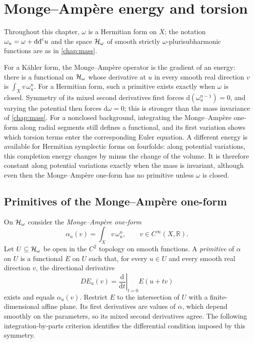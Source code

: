 \chapter{Monge--Amp\`ere energy and torsion}
\label{chap:energy}

Throughout this chapter, $\omega$ is a Hermitian form on $X$; the notation $\omega_u=\omega+\mathrm{dd}^{\mathrm{c}} u$ and the space $\mathcal H_\omega$ of smooth strictly $\omega$-plurisubharmonic functions are as in \cref{chap:mass}.

For a K\"ahler form, the Monge--Amp\`ere operator is the gradient of an energy: there is a functional on $\mathcal H_\omega$ whose derivative at $u$ in every smooth real direction $v$ is $\int_Xv\,\omega_u^n$. For a Hermitian form, such a primitive exists exactly when $\omega$ is closed. Symmetry of its mixed second derivatives first forces $\mathrm d(\omega_u^{n-1})=0$, and varying the potential then forces $\mathrm d\omega=0$; this is stronger than the mass invariance of \cref{chap:mass}. For a nonclosed background, integrating the Monge--Amp\`ere one-form along radial segments still defines a functional, and its first variation shows which torsion terms enter the corresponding Euler equation. A different energy is available for Hermitian symplectic forms on fourfolds: along potential variations, this completion energy changes by minus the change of the volume. It is therefore constant along potential variations exactly when the mass is invariant, although even then the Monge--Amp\`ere one-form has no primitive unless $\omega$ is closed.

\section{Primitives of the Monge--Amp\`ere one-form}

On $\mathcal H_\omega$ consider the \emph{Monge--Amp\`ere one-form}
\[
 \alpha_u(v)=\int_Xv\,\omega_u^n,\qquad v\in C^\infty(X,\mathbb R).
\]
Let $U\subseteq\mathcal H_\omega$ be open in the $C^2$ topology on smooth functions. A \emph{primitive} of $\alpha$ on $U$ is a functional $E$ on $U$ such that, for every $u\in U$ and every smooth real direction $v$, the directional derivative
\[
 DE_u(v)=\left.\frac{\mathrm d}{\mathrm dt}\right|_{t=0}E(u+tv)
\]
exists and equals $\alpha_u(v)$. Restrict $E$ to the intersection of $U$ with a finite-dimensional affine plane. Its first derivatives are values of $\alpha$, which depend smoothly on the parameters, so its mixed second derivatives agree. The following integration-by-parts criterion identifies the differential condition imposed by this symmetry.

